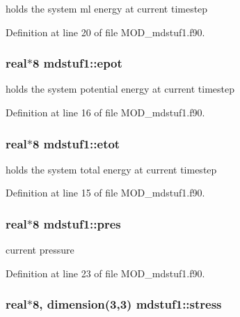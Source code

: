 holds the system ml energy at current timestep 



Definition at line 20 of file M\-O\-D\-\_\-mdstuf1.\-f90.

\hypertarget{classmdstuf1_af9358d2e64b3367e7328433ec1f4112f}{
\subsubsection[{epot}]{\setlength{\rightskip}{0pt plus 5cm}real$\ast$8 mdstuf1\-::epot}}\label{classmdstuf1_af9358d2e64b3367e7328433ec1f4112f}


holds the system potential energy at current timestep 



Definition at line 16 of file M\-O\-D\-\_\-mdstuf1.\-f90.

\hypertarget{classmdstuf1_a93644d9bdb342db25a67fd8ecbd48a76}{
\subsubsection[{etot}]{\setlength{\rightskip}{0pt plus 5cm}real$\ast$8 mdstuf1\-::etot}}\label{classmdstuf1_a93644d9bdb342db25a67fd8ecbd48a76}


holds the system total energy at current timestep 



Definition at line 15 of file M\-O\-D\-\_\-mdstuf1.\-f90.

\hypertarget{classmdstuf1_aa2b1ca9b0984aa24f64d346dc05b66f9}{
\subsubsection[{pres}]{\setlength{\rightskip}{0pt plus 5cm}real$\ast$8 mdstuf1\-::pres}}\label{classmdstuf1_aa2b1ca9b0984aa24f64d346dc05b66f9}


current pressure 



Definition at line 23 of file M\-O\-D\-\_\-mdstuf1.\-f90.

\hypertarget{classmdstuf1_a818a42a7bf46938e3866626a2d31124a}{
\subsubsection[{stress}]{\setlength{\rightskip}{0pt plus 5cm}real$\ast$8, dimension(3,3) mdstuf1\-::stress}}\label{classmdstuf1_a818a42a7bf46938e3866626a2d31124a}


